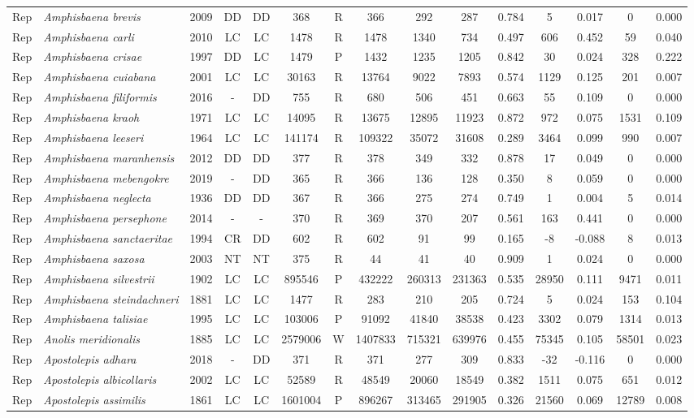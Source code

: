 \documentclass[12pt,openright,oneside,a4paper,english]{abntex2}
\begin{document}
\begin{landscape}
\begin{longtable}{llccccccccccccc}
		Rep&\textit{Amphisbaena brevis}&2009&DD&DD&368&R&366&292&287&0.784&5&0.017&0&0.000\\
		Rep&\textit{Amphisbaena carli}&2010&LC&LC&1478&R&1478&1340&734&0.497&606&0.452&59&0.040\\
		Rep&\textit{Amphisbaena crisae}&1997&DD&LC&1479&P&1432&1235&1205&0.842&30&0.024&328&0.222\\
		Rep&\textit{Amphisbaena cuiabana}&2001&LC&LC&30163&R&13764&9022&7893&0.574&1129&0.125&201&0.007\\
		Rep&\textit{Amphisbaena filiformis}&2016&-&DD&755&R&680&506&451&0.663&55&0.109&0&0.000\\
		Rep&\textit{Amphisbaena kraoh}&1971&LC&LC&14095&R&13675&12895&11923&0.872&972&0.075&1531&0.109\\
		Rep&\textit{Amphisbaena leeseri}&1964&LC&LC&141174&R&109322&35072&31608&0.289&3464&0.099&990&0.007\\
		Rep&\textit{Amphisbaena maranhensis}&2012&DD&DD&377&R&378&349&332&0.878&17&0.049&0&0.000\\
		Rep&\textit{Amphisbaena mebengokre}&2019&-&DD&365&R&366&136&128&0.350&8&0.059&0&0.000\\
		Rep&\textit{Amphisbaena neglecta}&1936&DD&DD&367&R&366&275&274&0.749&1&0.004&5&0.014\\
		Rep&\textit{Amphisbaena persephone}&2014&-&-&370&R&369&370&207&0.561&163&0.441&0&0.000\\
		Rep&\textit{Amphisbaena sanctaeritae}&1994&CR&DD&602&R&602&91&99&0.165&-8&-0.088&8&0.013\\
		Rep&\textit{Amphisbaena saxosa}&2003&NT&NT&375&R&44&41&40&0.909&1&0.024&0&0.000\\
		Rep&\textit{Amphisbaena silvestrii}&1902&LC&LC&895546&P&432222&260313&231363&0.535&28950&0.111&9471&0.011\\
		Rep&\textit{Amphisbaena steindachneri}&1881&LC&LC&1477&R&283&210&205&0.724&5&0.024&153&0.104\\
		Rep&\textit{Amphisbaena talisiae}&1995&LC&LC&103006&P&91092&41840&38538&0.423&3302&0.079&1314&0.013\\
		Rep&\textit{Anolis meridionalis}&1885&LC&LC&2579006&W&1407833&715321&639976&0.455&75345&0.105&58501&0.023\\
		Rep&\textit{Apostolepis adhara}&2018&-&DD&371&R&371&277&309&0.833&-32&-0.116&0&0.000\\
		Rep&\textit{Apostolepis albicollaris}&2002&LC&LC&52589&R&48549&20060&18549&0.382&1511&0.075&651&0.012\\
		Rep&\textit{Apostolepis assimilis}&1861&LC&LC&1601004&P&896267&313465&291905&0.326&21560&0.069&12789&0.008\\

\end{longtable}
\end{landscape}
\end{document}
